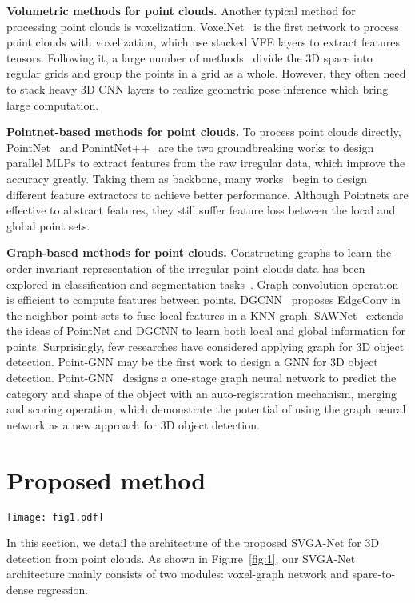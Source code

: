 \documentclass{article}
\begin{document}
{\bf Volumetric methods for point clouds.} Another typical method for processing point clouds is voxelization. VoxelNet~\cite{zhou2018voxelnet} is the first network to process point clouds with voxelization, which use stacked VFE layers to extract features tensors. Following it, a large number of methods~\cite{liu2019tanet,zhou2018voxelnet,yan2018second,shi2019pv,chen2019fast} divide the 3D space into regular grids and group the points in a grid as a whole. However, they often need to stack heavy 3D CNN layers to realize geometric pose inference which bring large computation.

{\bf Pointnet-based methods for point clouds.} To process point clouds directly, PointNet~\cite{qi2017pointnet} and PonintNet++~\cite{qi2017pointnet++} are the two groundbreaking works to design parallel MLPs to extract features from the raw irregular data, which improve the accuracy greatly. Taking them as backbone, many works~\cite{shi2019pointrcnn,qi2018frustum,lang2019pointpillars,shi2019part,yang2019std,yang20203dssd} begin to design different feature extractors to achieve better performance. Although Pointnets are effective to abstract features, they still suffer feature loss between the local and global point sets.

{\bf Graph-based methods for point clouds.} Constructing graphs to learn the order-invariant representation of the irregular point clouds data has been explored in classification and segmentation tasks~\cite{simonovsky2017dynamic,shen2018mining,kaul2019sawnet,Wang:2019:DGC:3341165.3326362}. Graph convolution operation is efficient to compute features between points. DGCNN~\cite{Wang:2019:DGC:3341165.3326362} proposes EdgeConv in the neighbor point sets to fuse local features in a KNN graph. SAWNet~\cite{kaul2019sawnet}  extends the ideas of PointNet and DGCNN to learn both local and global information for points. Surprisingly, few researches have considered applying graph for 3D object detection. Point-GNN may be the first work to design a GNN for 3D object detection. Point-GNN~\cite{Point-GNN} designs a one-stage graph neural network to predict the category and shape of the object with an auto-registration mechanism, merging and scoring operation, which demonstrate the potential of using the graph neural network as a new approach for 3D object detection.
\section{Proposed method}
\label{sec:sim}
\begin{figure*}[ht]
\centering
  \texttt{[image: fig1.pdf]}
  \caption{Architecture of the proposed SVGA-Net. The voxel-graph network takes raw point clouds as input, partitions the space into spherical voxels, transforms the points in each sphere to a vector representing the feature information. The sparse-to-dense regression module takes the aggregated features as input as generates the final boxes information.}
  \label{fig:1}
\end{figure*}
In this section, we detail the architecture of the proposed SVGA-Net for 3D detection from point clouds. As shown in Figure~\ref{fig:1}, our SVGA-Net architecture mainly consists of two modules: voxel-graph network and spare-to-dense regression.
\end{document}
